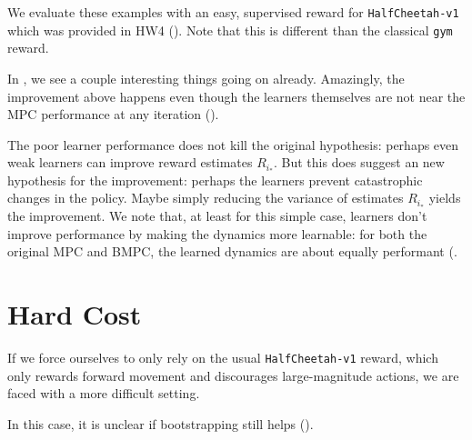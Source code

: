 \documentclass{article}
\begin{document}
We evaluate these examples with an easy, supervised reward for \texttt{HalfCheetah-v1} which was provided in HW4 (). Note that this is different than the classical \texttt{gym} reward.


In , we see a couple interesting things going on already. Amazingly, the improvement above happens even though the learners themselves are not near the MPC performance at any iteration ().


The poor learner performance does not kill the original hypothesis: perhaps even weak learners can improve reward estimates $R_{i_*}$. But this does suggest an new hypothesis for the improvement: perhaps the learners prevent catastrophic changes in the policy. Maybe simply reducing the variance of estimates $R_{i_*}$ yields the improvement. We note that, at least for this simple case, learners don't improve performance by making the dynamics more learnable: for both the original MPC and BMPC, the learned dynamics are about equally performant (.


\section{Hard Cost}

If we force ourselves to only rely on the usual \texttt{HalfCheetah-v1} reward, which only rewards forward movement and discourages large-magnitude actions, we are faced with a more difficult setting.

In this case, it is unclear if bootstrapping still helps ().
\end{document}
